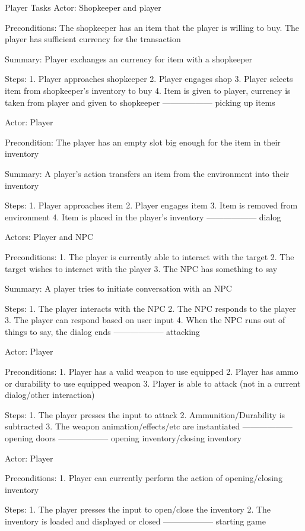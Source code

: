 \documentclass[12pt]{report}
\begin{document}
\begin{section}{Player Tasks}
Actor: Shopkeeper and player

Preconditions: The shopkeeper has an item that the player is willing to buy. The player has sufficient
currency for the transaction

Summary: Player exchanges an currency for item with a shopkeeper

Steps: 
1. Player approaches shopkeeper
2. Player engages shop
3. Player selects item from shopkeeper's inventory to buy
4. Item is given to player, currency is taken from player and given to shopkeeper
------------------
picking up items %

Actor: Player

Precondition: The player has an empty slot big enough for the item in their inventory

Summary: A player's action transfers an item from the environment into their inventory

Steps:
1. Player approaches item
2. Player engages item
3. Item is removed from environment
4. Item is placed in the player's  inventory
------------------
dialog %

Actors: Player and NPC

Preconditions:
1. The player is currently able to interact with the target
2. The target wishes to interact with the player
3. The NPC has something to say

Summary: A player tries to initiate conversation with an NPC

Steps:
1. The player interacts with the NPC
2. The NPC responds to the player
3. The player can respond based on user input
4. When the NPC runs out of things to say, the dialog ends
------------------
attacking %

Actor: Player

Preconditions:
1. Player has a valid weapon to use equipped
2. Player has ammo or durability to use equipped weapon
3. Player is able to attack (not in a current dialog/other interaction)

Steps:
1. The player presses the input to attack
2. Ammunition/Durability is subtracted
3. The weapon animation/effects/etc are instantiated
------------------
opening doors
------------------
opening inventory/closing inventory %

Actor: Player

Preconditions: 
1. Player can currently perform the action of opening/closing inventory

Steps:
1. The player presses the input to open/close the inventory
2. The inventory is loaded and displayed or closed 
------------------
starting game %


\end{section}
\end{document}
